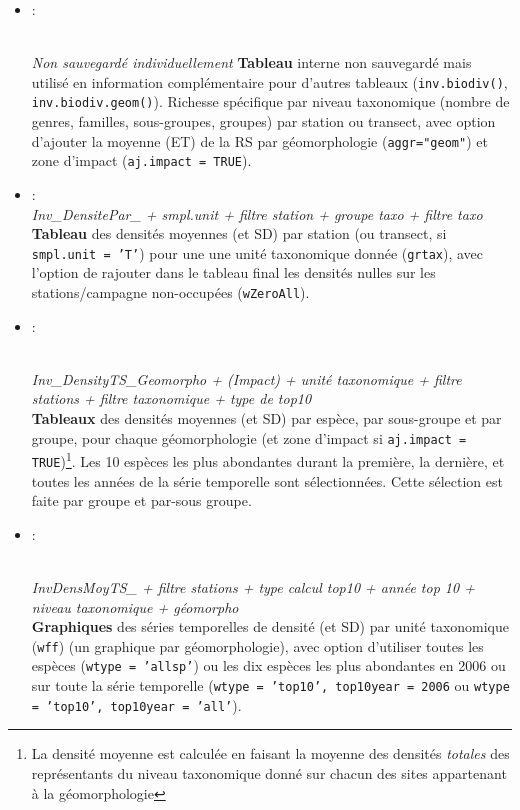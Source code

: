 \documentclass{article}
\begin{document}
\begin{itemize}
  \item[]  \hypertarget{i5}{:}\\
    \emph{Non sauvegardé individuellement}
    \textbf{Tableau} interne non sauvegardé mais utilisé en
    information complémentaire pour d'autres tableaux
    (\texttt{inv.biodiv()}, \texttt{inv.biodiv.geom()}). Richesse
    spécifique par niveau taxonomique (nombre de genres, familles, sous-groupes,
    groupes) par station ou transect, avec option d'ajouter la moyenne
    (ET) de la RS par géomorphologie (\texttt{aggr="geom"}) et zone
    d'impact (\texttt{aj.impact = TRUE}).

   \item[] \hypertarget{i6}{}:\\
\emph{Inv\_DensitePar\_ + smpl.unit + filtre station + groupe taxo + filtre taxo}\\
\textbf{Tableau} des densités moyennes (et SD) par station (ou
transect, si \texttt{smpl.unit = 'T'}) pour une
une unité taxonomique donnée (\texttt{grtax}), avec l'option de
rajouter dans le tableau final les densités nulles sur les
stations/campagne non-occupées (\texttt{wZeroAll}).

\item[] \hypertarget{i7}{:}\\
  \emph{Inv\_DensityTS\_Geomorpho + (Impact) + unité taxonomique +
    filtre stations + filtre taxonomique + type de top10}\\
  \textbf{Tableaux} des densités moyennes (et SD) par espèce, par
  sous-groupe et par groupe, pour chaque géomorphologie (et zone d'impact si \texttt{aj.impact =
    TRUE})\footnote{La densité moyenne est calculée en faisant la
    moyenne des densités \emph{totales} des représentants du niveau taxonomique donné sur
    chacun des sites appartenant à la géomorphologie}. Les 10 espèces les plus abondantes durant la première, la
  dernière, et toutes les années de la série temporelle sont
  sélectionnées. Cette sélection est faite par groupe et par-sous
  groupe.

\item[] \hypertarget{i8}{:}\\
  \emph{InvDensMoyTS\_ + filtre stations + type calcul top10 + année
    top 10 + niveau taxonomique + géomorpho} \\
  \textbf{Graphiques} des séries temporelles de densité (et SD) par
  unité taxonomique (\texttt{wff}) (un graphique par géomorphologie),
  avec option d'utiliser toutes les espèces (\texttt{wtype = 'allsp'})
  ou les dix espèces les plus abondantes en 2006 ou sur toute la série
  temporelle (\texttt{wtype = 'top10', top10year = 2006} ou
  \texttt{wtype = 'top10', top10year = 'all'}).



\end{itemize}
\end{document}
